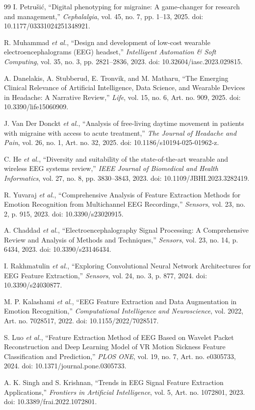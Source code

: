 \documentclass[12pt, a4paper]{report}
\begin{document}
\begin{thebibliography}{99}
I. Petru\v{s}i\'c, ``Digital phenotyping for migraine: A game-changer for research and management,'' \textit{Cephalalgia}, vol. 45, no. 7, pp. 1--13, 2025. doi: 10.1177/03331024251348921.

R. Muhammad \textit{et al.}, ``Design and development of low-cost wearable electroencephalograms (EEG) headset,'' \textit{Intelligent Automation \& Soft Computing}, vol. 35, no. 3, pp. 2821--2836, 2023. doi: 10.32604/iasc.2023.029815.

A. Danelakis, A. Stubberud, E. Tronvik, and M. Matharu, ``The Emerging Clinical Relevance of Artificial Intelligence, Data Science, and Wearable Devices in Headache: A Narrative Review,'' \textit{Life}, vol. 15, no. 6, Art. no. 909, 2025. doi: 10.3390/life15060909.

J. Van Der Donckt \textit{et al.}, ``Analysis of free-living daytime movement in patients with migraine with access to acute treatment,'' \textit{The Journal of Headache and Pain}, vol. 26, no. 1, Art. no. 32, 2025. doi: 10.1186/s10194-025-01962-z.

C. He \textit{et al.}, ``Diversity and suitability of the state-of-the-art wearable and wireless EEG systems review,'' \textit{IEEE Journal of Biomedical and Health Informatics}, vol. 27, no. 8, pp. 3830--3843, 2023. doi: 10.1109/JBHI.2023.3282419.

R. Yuvaraj \textit{et al.}, ``Comprehensive Analysis of Feature Extraction Methods for Emotion Recognition from Multichannel EEG Recordings,'' \textit{Sensors}, vol. 23, no. 2, p. 915, 2023. doi: 10.3390/s23020915.

A. Chaddad \textit{et al.}, ``Electroencephalography Signal Processing: A Comprehensive Review and Analysis of Methods and Techniques,'' \textit{Sensors}, vol. 23, no. 14, p. 6434, 2023. doi: 10.3390/s23146434.

I. Rakhmatulin \textit{et al.}, ``Exploring Convolutional Neural Network Architectures for EEG Feature Extraction,'' \textit{Sensors}, vol. 24, no. 3, p. 877, 2024. doi: 10.3390/s24030877.

M. P. Kalashami \textit{et al.}, ``EEG Feature Extraction and Data Augmentation in Emotion Recognition,'' \textit{Computational Intelligence and Neuroscience}, vol. 2022, Art. no. 7028517, 2022. doi: 10.1155/2022/7028517.

S. Luo \textit{et al.}, ``Feature Extraction Method of EEG Based on Wavelet Packet Reconstruction and Deep Learning Model of VR Motion Sickness Feature Classification and Prediction,'' \textit{PLOS ONE}, vol. 19, no. 7, Art. no. e0305733, 2024. doi: 10.1371/journal.pone.0305733.

A. K. Singh and S. Krishnan, ``Trends in EEG Signal Feature Extraction Applications,'' \textit{Frontiers in Artificial Intelligence}, vol. 5, Art. no. 1072801, 2023. doi: 10.3389/frai.2022.1072801.

\end{thebibliography}
\end{document}
